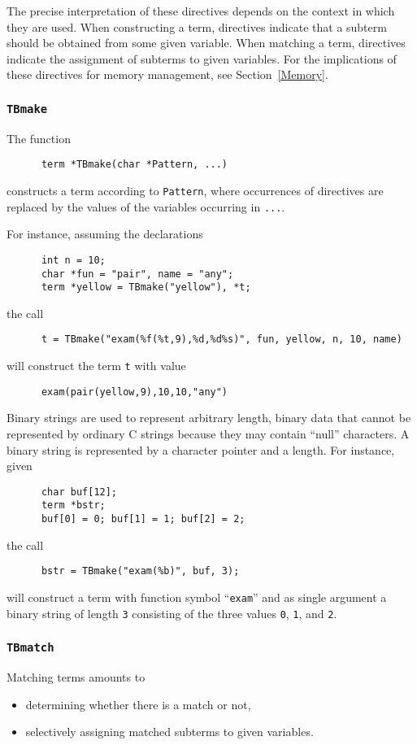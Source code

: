 \documentclass[a4,twoside,noweb]{article} %
\begin{document}
The precise interpretation of these directives depends on the context
in which they are used.  When constructing a term, directives indicate
that a subterm should be obtained from some given variable.  When
matching a term, directives indicate the assignment of subterms to
given variables.
For the implications of these directives for memory management,
see Section~\ref{Memory}.

\subsubsection{\label{TBmake}{\tt TBmake}}
The function
\begin{verbatim}
      term *TBmake(char *Pattern, ...)
\end{verbatim}
constructs a term according to {\tt Pattern}, where occurrences of
directives are replaced by the values of the variables
occurring in {\tt ...}.

For instance, assuming the declarations
\begin{verbatim}
      int n = 10;
      char *fun = "pair", name = "any";
      term *yellow = TBmake("yellow"), *t;
\end{verbatim}
the call
\begin{verbatim}
      t = TBmake("exam(%f(%t,9),%d,%d%s)", fun, yellow, n, 10, name)
\end{verbatim}
will construct the term {\tt t} with value
\begin{verbatim}
      exam(pair(yellow,9),10,10,"any")
\end{verbatim}

Binary strings are used to represent arbitrary length, binary data
that cannot be represented by ordinary C strings because they may
contain ``null'' characters. A binary string is represented by
a character pointer and a length. For instance, given
\begin{verbatim}
      char buf[12];
      term *bstr;
      buf[0] = 0; buf[1] = 1; buf[2] = 2;
\end{verbatim}
the call
\begin{verbatim}
      bstr = TBmake("exam(%b)", buf, 3);
\end{verbatim}
will construct a term with function symbol ``{\tt exam}'' and as single
argument a binary string of length {\tt 3} consisting of the three
values {\tt 0}, {\tt 1}, and {\tt 2}.

\subsubsection{\label{TBmatch}{\tt TBmatch}}
Matching terms amounts to
\begin{itemize}
\item determining whether there is a match or not,
\item selectively assigning matched subterms to given variables.
\end{itemize}
\end{document}
